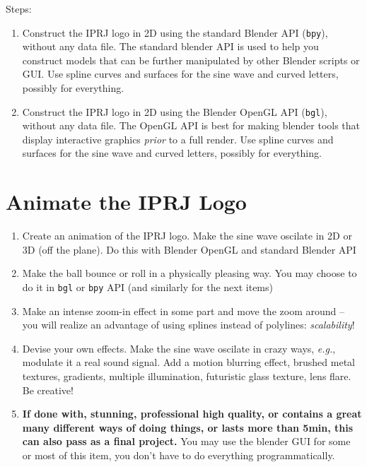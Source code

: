 \documentclass[a4paper]{article}
\newcommand{\eg}{{\it e.g.}}
\begin{document}
Steps:
\begin{enumerate}
\item Construct the IPRJ logo in 2D using the standard Blender API
(\texttt{bpy}), without any
data file. The standard blender API is used to help you construct models that
can be further manipulated by other Blender scripts or GUI. Use 
spline curves and surfaces for the sine wave and curved letters, possibly for everything.
\item Construct the IPRJ logo in 2D using the Blender OpenGL API
(\texttt{bgl}), without any
data file. The OpenGL API is best for making blender tools that display
interactive graphics
\emph{prior} to a full render. Use 
spline curves and surfaces for the sine wave and curved letters, possibly for everything.
\end{enumerate}

\section{Animate the IPRJ Logo}
\begin{enumerate}
\item Create an animation of the IPRJ logo. Make the sine wave oscilate in 2D or 
3D (off the plane). Do this with Blender OpenGL and standard Blender API
\item Make the ball bounce or roll in a physically pleasing way. You may choose
to do it in \texttt{bgl} or \texttt{bpy} API (and similarly for the next items)
\item Make an intense zoom-in effect in some part and move the zoom around --
you will realize an advantage of
using splines instead of polylines: \emph{scalability}!
\item Devise your own effects. Make the sine wave oscilate in crazy ways,
\eg, modulate it a real sound signal. Add a motion blurring effect, brushed
metal textures, gradients, multiple illumination, futuristic glass texture, lens flare. Be creative!
\item \textbf{If done with,
stunning, professional high quality, or contains a great many different ways of
doing things, or lasts more than 5min, this can also pass as a final project.}
You may use the blender GUI for some or most of this item, you don't have to do everything programmatically.
\end{enumerate}



\end{document}
